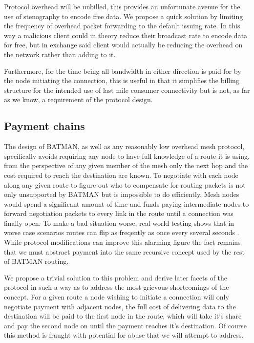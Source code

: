 \documentclass[11pt]{article}
\begin{document}
                Protocol overhead will be unbilled, this provides an unfortunate avenue for the use of stenography to encode free data. We propose a quick solution by limiting the frequency of overhead packet forwarding to the default issuing rate. In this way a malicious client could in theory reduce their broadcast rate to encode data for free, but in exchange said client would actually be reducing the overhead on the network rather than adding to it.

                Furthermore, for the time being all bandwidth in either direction is paid for by the node initiating the connection, this is useful in that it simplifies the billing structure for the intended use of last mile consumer connectivity but is not, as far as we know, a requirement of the protocol design.

	\subsection{Payment chains}

               The design of BATMAN, as well as any reasonably low overhead mesh protocol, specifically avoids requiring any node to have full knowledge of a route it is using, from the perspective of any given member of the mesh only the next hop and the cost required to reach the destination are known. To negotiate with each node along any given route to figure out who to compensate for routing packets is not only unsupported by BATMAN but is impossible to do efficiently. Mesh nodes would spend a significant amount of time and funds paying intermediate nodes to forward negotiation packets to every link in the route until a connection was finally open. To make a bad situation worse, real world testing shows that in worse case scenarios routes can flip as freqently as once every several seconds \cite{meshflip}. While protocol modifications can improve this alarming figure the fact remains that we must abstract payment into the same recursive concept used by the rest of BATMAN routing.

               We propose a trivial solution to this problem and derive later facets of the protocol in such a way as to address the most grievous shortcomings of the concept. For a given route a node wishing to initiate a connection will only negotiate payment with adjacent nodes, the full cost of delivering data to the destination will be paid to the first node in the route, which will take it's share and pay the second node on until the payment reaches it's destination. Of course this method is fraught with potential for abuse that we will attempt to address.
\end{document}
